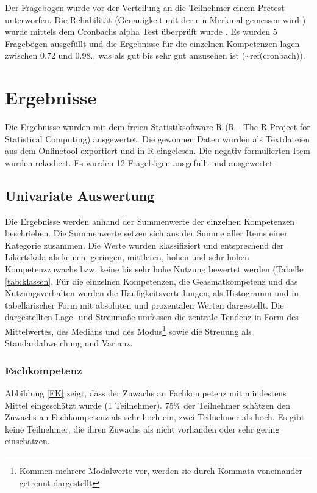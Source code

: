 \documentclass[12pt, bibliography=totoc]{scrartcl}
\begin{document}
Der Fragebogen wurde vor der Verteilung an die Teilnehmer einem Pretest
unterworfen. Die Reliabilität (Genauigkeit mit der ein Merkmal gemessen
wird \parencite[5]{rammstedt2004bestimmung}) wurde mittels dem Cronbachs
alpha Test überprüft wurde \parencite{Wassa}. Es wurden 5 Fragebögen
ausgefüllt und die Ergebnisse für die einzelnen Kompetenzen lagen
zwischen 0.72 und 0.98., was als gut bis sehr gut anzusehen ist
(\textasciitilde{}ref(cronbach)).

\section{Ergebnisse}\label{ergebnisse}

Die Ergebnisse wurden mit dem freien Statistiksoftware R (R - The R
Project for Statistical Computing) ausgewertet. Die gewonnen Daten
wurden als Textdateien aus dem Onlinetool exportiert und in R
eingelesen. Die negativ formulierten Item wurden rekodiert. Es wurden 12
Fragebögen ausgefüllt und ausgewertet.

\subsection{Univariate Auswertung}\label{univariate-auswertung}

Die Ergebnisse werden anhand der Summenwerte der einzelnen Kompetenzen
beschrieben. Die Summenwerte setzen sich aus der Summe aller Items einer
Kategorie zusammen. Die Werte wurden klassifiziert und entsprechend der
Likertskala als keinen, geringen, mittleren, hohen und sehr hohen
Kompetenzzuwachs bzw. keine bis sehr hohe Nutzung bewertet werden
(Tabelle \ref{tab:klassen}. Für die einzelnen Kompetenzen, die
Geasmatkompetenz und das Nutzungsverhalten werden die
Häufigkeitsverteilungen, als Histogramm und in tabellarischer Form mit
absoluten und prozentalen Werten dargestellt. Die dargestellten Lage-
und Streumaße umfassen die zentrale Tendenz in Form des Mittelwertes,
des Medians und des
Modus\footnote{Kommen mehrere Modalwerte vor, werden sie durch Kommata voneinander getrennt dargestellt}
sowie die Streuung als Standardabweichung und Varianz.

\subsubsection{Fachkompetenz}\label{fachkompetenz}

Abbildung \ref{FK} zeigt, dass der Zuwachs an Fachkompetenz mit
mindestens Mittel eingeschätzt wurde (1 Teilnehmer). 75\% der Teilnehmer
schätzen den Zuwachs an Fachkompetenz als sehr hoch ein, zwei Teilnehmer
als hoch. Es gibt keine Teilnehmer, die ihren Zuwachs als nicht
vorhanden oder sehr gering einschätzen.
\end{document}
